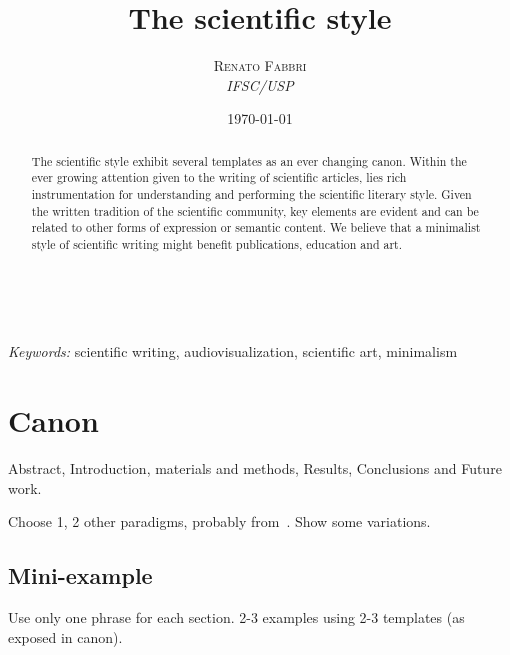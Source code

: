 \documentclass[a4paper, 11pt]{article} %
\title{\textbf{The scientific style}} %
\author{\textsc{Renato Fabbri} %
\\{\textit{IFSC/USP}}} %
\date{\today} %
\makeatletter
\renewcommand{\maketitle}{ %
\begin{flushright} %
{\LARGE\@title} %

\vspace{50pt} %

{\large\@author} %
\\\@date %

\vspace{40pt} %
\end{flushright}
}
\makeatother
\begin{document}
\maketitle %




{
\begin{abstract}
The scientific style exhibit several templates as an ever changing canon.
Within the ever growing attention given to the writing of scientific articles, lies rich instrumentation for understanding and performing the scientific literary style. Given the written tradition of the scientific community, key elements are evident and can be related to other forms of expression or semantic content. We believe that a minimalist style of scientific writing might benefit publications, education and art.
\end{abstract}
}



\hspace*{3,6mm}\textit{Keywords:} scientific writing, audiovisualization, scientific art, minimalism %


\newpage
\tableofcontents


\section*{Canon}
Abstract, Introduction, materials and methods, Results, Conclusions and Future work.

Choose 1, 2 other paradigms, probably from~\cite{livro}. Show some variations.

\subsection*{Mini-example}
Use only one phrase for each section. 2-3 examples using 2-3 templates (as exposed in canon).
\end{document}
